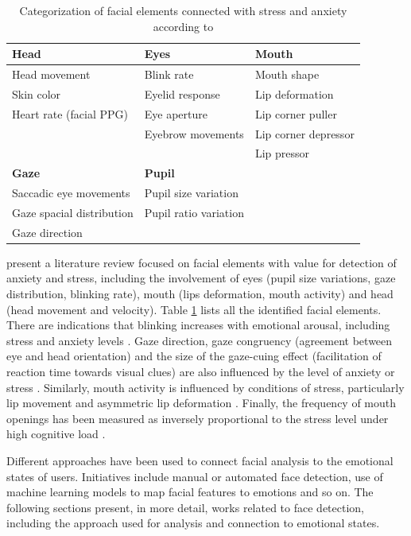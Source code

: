\begin{table}[h!]
\caption{Categorization of facial elements connected with stress and anxiety according to \textcite{giannakakis2017stress}}
\label{table:stress-facial-features}
\begin{tabular}{lll}%
\toprule%
\textbf{Head} & \textbf{Eyes} & \textbf{Mouth} \\
\midrule
Head movement & Blink rate & Mouth shape \\
Skin color & Eyelid response & Lip deformation  \\
Heart rate (facial PPG) & Eye aperture & Lip corner puller \\
& Eyebrow movements & Lip corner depressor \\
& & Lip pressor \\
\midrule
\textbf{Gaze} & \textbf{Pupil} & \\
\midrule
Saccadic eye movements & Pupil size variation &  \\
Gaze spacial distribution & Pupil ratio variation &  \\
Gaze direction & &\\
\bottomrule%
\end{tabular}%
\end{table}

\textcite{giannakakis2017stress} present a literature review focused on facial elements with value for detection of anxiety and stress, including the involvement of eyes (pupil size variations, gaze distribution, blinking rate), mouth (lips deformation, mouth activity) and head (head movement and velocity). Table \ref{table:stress-facial-features} lists all the identified facial elements. There are indications that blinking increases with emotional arousal, including stress and anxiety levels \parencite{dinges2005optical}. Gaze direction, gaze congruency (agreement between eye and head orientation) and the size of the gaze-cuing effect (facilitation of reaction time towards visual clues) are also influenced by the level of anxiety or stress \parencite{staab2014influence}. Similarly, mouth activity is influenced by conditions of stress, particularly lip movement \parencite{dinges2005optical} and asymmetric lip deformation \parencite{metaxas2004image}. Finally, the frequency of mouth openings has been measured as inversely proportional to the stress level under high cognitive load \parencite{liao2005decision}.

Different approaches have been used to connect facial analysis to the emotional states of users. Initiatives include manual or automated face detection, use of machine learning models to map facial features to emotions and so on. The following sections present, in more detail, works related to face detection, including the approach used for analysis and connection to emotional states.

